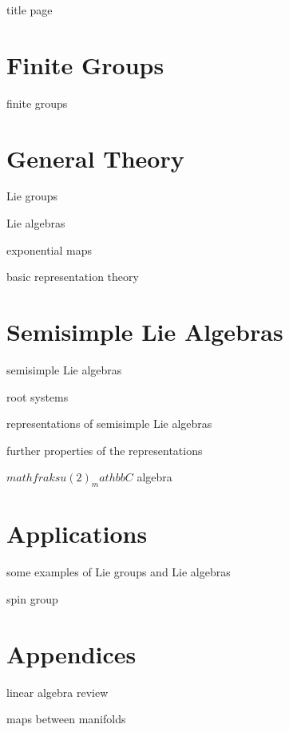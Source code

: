 \documentclass[10pt, a4paper]{report}
\numberwithin{equation}{section}
\begin{document}
	{title page}
	
	\tableofcontents
	
	\part{Finite Groups}
	
	{finite groups}
	
	\part{General Theory}
	
	{Lie groups}
	
	{Lie algebras}
	
	{exponential maps}
	
	{basic representation theory}
	
	\part{Semisimple Lie Algebras}
	
	{semisimple Lie algebras}
	
	{root systems}
	
	{representations of semisimple Lie algebras}
	
	{further properties of the representations}
	
	{$mathfrak{su}(2)_mathbb{C}$ algebra}
	
	\part{Applications}
	
	{some examples of Lie groups and Lie algebras}
	
	{spin group}
	
	\appendix
	
	\part*{Appendices}
	
	{linear algebra review}
	
	{maps between manifolds}
\end{document}

